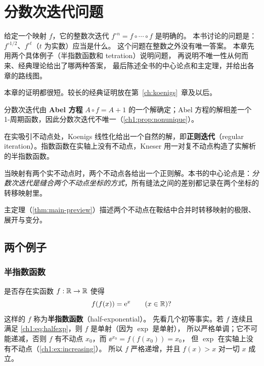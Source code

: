 \chapter{分数次迭代问题}\label{ch:intro}

给定一个映射 $f$，它的整数次迭代 $f^{\circ n}=f\circ\cdots\circ f$ 是明确的。
本书讨论的问题是：$f^{\circ 1/2}$、$f^{\circ t}$（$t$ 为实数）应当是什么。
这个问题在整数之外没有唯一答案。
本章先用两个具体例子（半指数函数和 tetration）说明问题，
再说明不唯一性从何而来、经典理论给出了哪两种答案，
最后陈述全书的中心论点和主定理，并给出各章的路线图。

本章的证明都很短。较长的经典证明放在第~\ref{ch:koenigs}~章及以后。

\begin{goals}
\item 分数次迭代由 \textbf{Abel 方程} $A\circ f=A+1$ 的一个解确定；Abel 方程的解相差一个 1-周期函数，因此分数次迭代不唯一（\cref{ch1:prop:nonunique}）。
\item 在实吸引不动点处，Koenigs 线性化给出一个自然的解，即\textbf{正则迭代}（regular iteration）。指数函数在实轴上没有不动点，Kneser 用一对复不动点构造了实解析的半指数函数。
\item 当映射有两个实不动点时，两个不动点各给出一个正则解。本书的中心论点是：\emph{分数次迭代是缝合两个不动点坐标的方式}，所有缝法之间的差别都记录在两个坐标的转移映射里。
\item 主定理（\cref{thm:main-preview}）描述两个不动点在鞍结中合并时转移映射的极限、展开与变分。
\end{goals}

\section{两个例子}\label{ch1:sec:examples}

\subsection{半指数函数}

是否存在实函数 $f:\mathbb{R}\to\mathbb{R}$ 使得
\begin{equation}\label{ch1:eq:halfexp}
  f(f(x))=\mathrm{e}^{x}\qquad(x\in\mathbb{R})?
\end{equation}
这样的 $f$ 称为\textbf{半指数函数}（half-exponential）。
先看几个初等事实。若 $f$ 连续且满足 \eqref{ch1:eq:halfexp}，则 $f$ 是单射（因为 $\exp$ 是单射），
所以严格单调；它不可能递减，否则 $f$ 有不动点 $x_0$，而 $\ee^{x_0}=f(f(x_0))=x_0$，
但 $\exp$ 在实轴上没有不动点（\cref{ch1:ex:increasing}）。
所以 $f$ 严格递增，并且 $f(x)>x$ 对一切 $x$ 成立。

